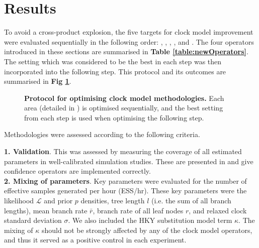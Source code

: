 \documentclass[10pt,letterpaper]{article}
\begin{document}
\clearpage
\section*{Results} \label{sect:results}





To avoid a cross-product explosion, the five targets for clock model improvement were evaluated sequentially in the following order: \textbf{}, \textbf{}, \textbf{}, \textbf{}, and \textbf{}.
The four operators introduced in these sections are summarised in \textbf{Table \ref{table:newOperators}}.
The setting which was considered to be the best in each step was then incorporated into the following step. 
This protocol and its outcomes are summarised in \textbf{Fig \ref{fig:tournament}}.





\begin{figure}[!h]
\caption{\textbf{Protocol for optimising clock model methodologies.} Each area (detailed in \textbf{}) is optimised sequentially, and the best setting from each step is used when optimising the following step.}
\label{fig:tournament}
\end{figure}


Methodologies were assessed according to the following criteria.


\textbf{1. Validation}. This was assessed by measuring the coverage of all estimated parameters in well-calibrated simulation studies. 
These are presented in \textbf{} and give confidence operators are implemented correctly. \\


\textbf{2. Mixing of parameters}. Key parameters were evaluated for the number of effective samples generated per hour (ESS/hr).
These key parameters were the likelihood $\mathcal{L}$ and prior $p$ densities,  tree length $l$ (i.e. the sum of all branch lengths), mean branch rate $\bar{r}$, branch rate of all leaf nodes $r$, and relaxed clock standard deviation $\sigma$.
We also included the HKY substitution model term $\kappa$. 
The mixing of $\kappa$ should not be strongly affected by any of the clock model operators, and thus it served as a positive control in each experiment. \\
\end{document}
